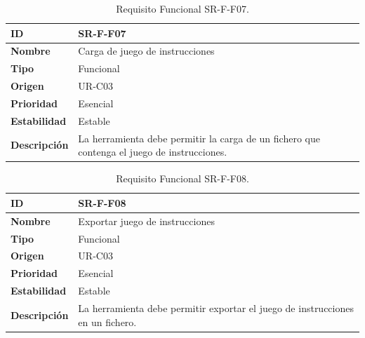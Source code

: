 \begin{center}
\begin{table}[htbp]
\centering
\begin{tabular}{@{}p{2.5cm} p{9cm}@{}} 
\toprule
\textbf{ID} 				& SR-F-F07 \\
\midrule
\textbf{Nombre} 			& Carga de juego de instrucciones\\
\midrule
\textbf{Tipo} 			& Funcional \\
\midrule
\textbf{Origen} 			& UR-C03 \\
\midrule
\textbf{Prioridad}		& Esencial \\
\midrule
\textbf{Estabilidad} 		& Estable \\
\midrule
\textbf{Descripción} 	& La herramienta debe permitir la carga de un fichero que contenga el juego de instrucciones. \\
\bottomrule
\end{tabular}
\caption{Requisito Funcional SR-F-F07.}
\label{tab:srff07}
\end{table}
\end{center}

\begin{center}
\begin{table}[htbp]
\centering
\begin{tabular}{@{}p{2.5cm} p{9cm}@{}} 
\toprule
\textbf{ID} 				& SR-F-F08 \\
\midrule
\textbf{Nombre} 			& Exportar juego de instrucciones\\
\midrule
\textbf{Tipo} 			& Funcional \\
\midrule
\textbf{Origen} 			& UR-C03 \\
\midrule
\textbf{Prioridad}		& Esencial \\
\midrule
\textbf{Estabilidad} 		& Estable \\
\midrule
\textbf{Descripción} 	& La herramienta debe permitir exportar el juego de instrucciones en un fichero. \\
\bottomrule
\end{tabular}
\caption{Requisito Funcional SR-F-F08.}
\label{tab:srff08}
\end{table}
\end{center}

